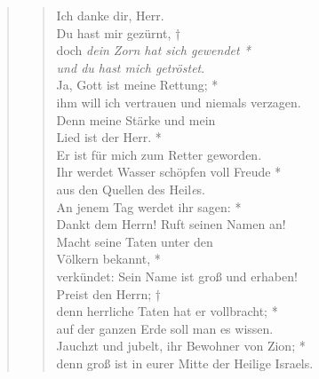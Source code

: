 \begin{quote}
 



\begin{verse}
 
Ich danke dir, Herr.\\ Du hast mir gezürnt, † \\ doch \textit{ dein Zorn hat sich gewendet *\\ und du hast mich getröstet}.\\ \vin
Ja, Gott ist meine Rettung; *\\ \vin
ihm will ich vertrauen und niemals verzagen.\\ 
Denn meine Stärke und mein \\ Lied ist der Herr. *\\ Er ist für mich zum Retter geworden.\\ \vin 
Ihr werdet Wasser schöpfen voll Freude *\\ \vin
aus den Quellen des Heil\textit{e}s.\\
An jenem Tag werdet ihr sagen: *\\
Dankt dem Herrn! Ruft seinen Namen an!\\ \vin 
Macht seine Taten unter den \\ \vin Völkern bekannt, *\\ \vin verkündet: Sein Name ist groß und erhaben!\\
Preist den Herrn; †\\
denn herrliche Taten hat er vollbracht; *\\ auf der ganzen Erde soll man es wissen.\\ \vin
Jauchzt und jubelt, ihr Bewohner von Zion; *\\ \vin
denn groß ist in eurer Mitte der Heilige Israels.\\
\end{verse}

\end{quote}

\vspace{0.6cm}

\vspace{0.6cm}

\def\greinitialformat#1{{\fontsize{40}{40}\selectfont #1}}
\gresetfirstlineaboveinitial{\small \textcolor{red}{Ps 90}}{}
\setaboveinitialseparation{0.72mm}


